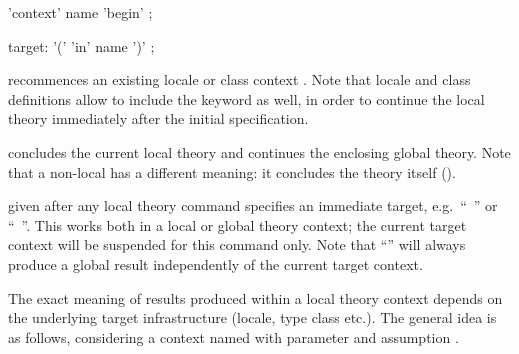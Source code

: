 \begin{isabellebody}
\begin{isamarkuptext}
  \begin{rail}
    'context' name 'begin'
    ;

    target: '(' 'in' name ')'
    ;
  \end{rail}

  \begin{descr}
  
  \item [\mbox{\isa{\isacommand{context}}}~\isa{{\isachardoublequote}c\ {\isasymBEGIN}{\isachardoublequote}}] recommences an
  existing locale or class context .  Note that locale and
  class definitions allow to include the \mbox{}
  keyword as well, in order to continue the local theory immediately
  after the initial specification.
  
  \item [\mbox{\isa{\isacommand{end}}}] concludes the current local theory and
  continues the enclosing global theory.  Note that a non-local
  \mbox{} has a different meaning: it concludes the theory
  itself ().
  
  \item [\isa{{\isachardoublequote}{\isacharparenleft}{\isasymIN}\ c{\isacharparenright}{\isachardoublequote}}] given after any local theory command
  specifies an immediate target, e.g.\ ``\mbox{}~'' or ``\mbox{}~''.  This works both in a local or
  global theory context; the current target context will be suspended
  for this command only.  Note that ``\isa{{\isachardoublequote}{\isacharparenleft}{\isasymIN}\ {\isacharminus}{\isacharparenright}{\isachardoublequote}}'' will
  always produce a global result independently of the current target
  context.

  \end{descr}

  The exact meaning of results produced within a local theory context
  depends on the underlying target infrastructure (locale, type class
  etc.).  The general idea is as follows, considering a context named
   with parameter  and assumption .
  

\end{isamarkuptext}
\end{isabellebody}
